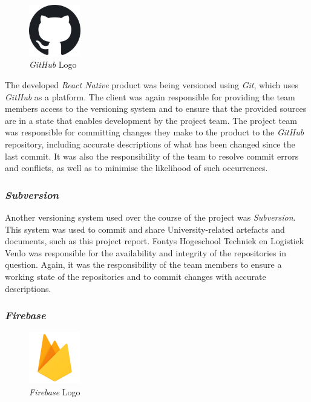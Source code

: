 \begin{figure}[H]
    \begin{center}
        \includegraphics[width=0.2\textwidth]{images/logos/github-logo.png}
        \caption{\textit{GitHub} Logo}
        \label{fig:github_logo}
    \end{center}
\end{figure}

The developed \textit{React Native} product was being versioned using \textit{Git}, which uses \textit{GitHub} as a platform. The client was again responsible for providing the team members access to the versioning system and to ensure that the provided sources are in a state that enables development by the project team.
\newline
The project team was responsible for committing changes they make to the product to the \textit{GitHub} repository, including accurate descriptions of what has been changed since the last commit. It was also the responsibility of the team to resolve commit errors and conflicts, as well as to minimise the likelihood of such occurrences.

\subsubsection{\textit{Subversion}}
\label{sssec:subversion}

Another versioning system used over the course of the project was \textit{Subversion}. This system was used to commit and share University-related artefacts and documents, such as this project report.
\newline
Fontys Hogeschool Techniek en Logistiek Venlo was responsible for the availability and integrity of the repositories in question. Again, it was the responsibility of the team members to ensure a working state of the repositories and to commit changes with accurate descriptions.

\subsubsection{\textit{Firebase}}
\label{sssec:firebase}

\begin{figure}[H]
    \begin{center}
        \includegraphics[width=0.2\textwidth]{images/logos/firebase-logo.png}
        \caption{\textit{Firebase} Logo}
        \label{fig:firebase_logo}
    \end{center}
\end{figure}

